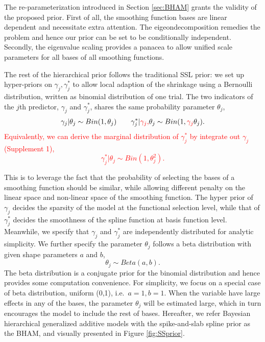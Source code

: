\documentclass[AMA,STIX1COL,]{WileyNJD-v2}
\begin{document}
The re-parameterization introduced in Section \ref{sec:BHAM} grants the
validity of the proposed prior. First of all, the smoothing function
bases are linear dependent and necessitate extra attention. The
eigeondecomposition remedies the problem and hence our prior can be set
to be conditionally independent. Secondly, the eigenvalue scaling
provides a panacea to allow unified scale parameters for all bases of
all smoothing functions.

The rest of the hierarchical prior follows the traditional SSL prior: we
set up hyper-priors on \(\gamma_j, \gamma^*_j\) to allow local adaption
of the shrinkage using a Bernoulli distribution, written as binomial
distribution of one trial. The two indicators of the \(j\)th predictor,
\(\gamma_j\) and \(\gamma^*_j\), shares the same probability parameter
\(\theta_j\), \[
\begin{aligned}
&\gamma_{j} | \theta_j \sim Bin(1, \theta_j) & & 
&\gamma_{j}^*| \textcolor{red}{\gamma_{j}, } \theta_j \sim Bin(1, \textcolor{red}{\gamma_{j}}\theta_j).
\end{aligned}
\]
\textcolor{red}{Equivalently, we can derive the marginal distribution of $\gamma_{j}^*$ by integrate out $\gamma_j$ (Supplement 1), 
$$
\gamma_{j}^*| \theta_j \sim Bin(1, \theta_j^2).
$$
}

This is to leverage the fact that the probability of selecting the bases
of a smoothing function should be similar, while allowing different
penalty on the linear space and non-linear space of the smoothing
function. The hyper prior of \(\gamma_{j}\) decides the sparsity of the
model at the functional selection level, while that of \(\gamma_{j}^*\)
decides the smoothness of the spline function at basis function level.
Meanwhile, we specify that \(\gamma_{j}\) and \(\gamma_{j}^*\) are
independently distributed for analytic simplicity. We further specify
the parameter \(\theta_j\) follows a beta distribution with given shape
parameters \(a\) and \(b\), \[
\theta_j \sim Beta(a, b).
\] The beta distribution is a conjugate prior for the binomial
distribution and hence provides some computation convenience. For
simplicity, we focus on a special case of beta distribution, uniform
(0,1), i.e.~\(a = 1, b = 1\). When the variable have large effects in
any of the bases, the parameter \(\theta_j\) will be estimated large,
which in turn encourages the model to include the rest of bases.
Hereafter, we refer Bayesian hierarchical generalized additive models
with the spike-and-slab spline prior as the BHAM, and visually presented
in Figure \ref{fig:SSprior}.
\end{document}
